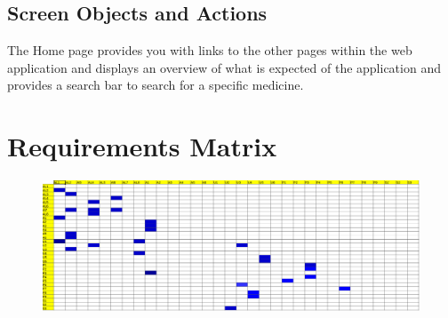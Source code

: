 \documentclass[]{article}
\begin{document}
\subsection {Screen Objects and Actions}
The Home page provides you with links to the other pages within the web application and displays an overview of what is expected of the application and provides a search bar to search for a specific medicine.


\section{Requirements Matrix}

\begin{figure}[H]
\centering
\includegraphics[scale=0.2]{./tractability}
\end{figure}




\end{document}
